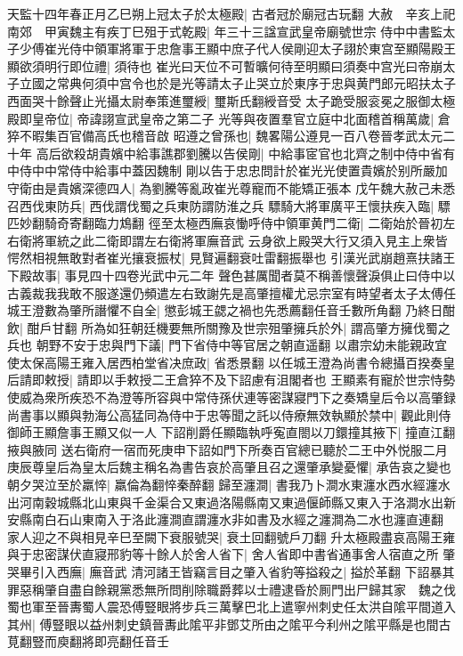 天監十四年春正月乙巳朔上冠太子於太極殿|{
	古者冠於廟冠古玩翻}
大赦　辛亥上祀南郊　甲寅魏主有疾丁巳殂于式乾殿|{
	年三十三諡宣武皇帝廟號世宗}
侍中中書監太子少傅崔光侍中領軍將軍于忠詹事王顯中庶子代人侯剛迎太子詡於東宫至顯陽殿王顯欲須明行即位禮|{
	須待也}
崔光曰天位不可暫曠何待至明顯曰須奏中宫光曰帝崩太子立國之常典何須中宫令也於是光等請太子止哭立於東序于忠與黄門郎元昭扶太子西面哭十餘聲止光攝太尉奉策進璽綬|{
	璽斯氏翻綬音受}
太子跪受服衮冕之服御太極殿即皇帝位|{
	帝諱詡宣武皇帝之第二子}
光等與夜置羣官立庭中北面稽首稱萬歲|{
	倉猝不暇集百官備高氏也稽音啟}
昭遵之曾孫也|{
	魏畧陽公遵見一百八卷晉孝武太元二十年}
高后欲殺胡貴嬪中給事譙郡劉騰以告侯剛|{
	中給事宧官也北齊之制中侍中省有中侍中中常侍中給事中蓋因魏制}
剛以告于忠忠問計於崔光光使置貴嬪於别所嚴加守衛由是貴嬪深德四人|{
	為劉騰等亂政崔光尊寵而不能矯正張本}
戊午魏大赦己未悉召西伐東防兵|{
	西伐謂伐蜀之兵東防謂防淮之兵}
驃騎大將軍廣平王懷扶疾入臨|{
	驃匹妙翻騎奇寄翻臨力鴆翻}
徑至太極西廡哀慟呼侍中領軍黄門二衛|{
	二衛始於晉初左右衛將軍統之此二衛即謂左右衛將軍廡音武}
云身欲上殿哭大行又須入見主上衆皆愕然相視無敢對者崔光攘衰振杖|{
	見賢遍翻衰吐雷翻振舉也}
引漢光武崩趙熹扶諸王下殿故事|{
	事見四十四卷光武中元二年}
聲色甚厲聞者莫不稱善懷聲淚俱止曰侍中以古義裁我我敢不服遂還仍頻遣左右致謝先是高肇擅權尤忌宗室有時望者太子太傅任城王澄數為肇所譖懼不自全|{
	懲彭城王勰之禍也先悉薦翻任音壬數所角翻}
乃終日酣飲|{
	酣戶甘翻}
所為如狂朝廷機要無所關豫及世宗殂肇擁兵於外|{
	謂高肇方擁伐蜀之兵也}
朝野不安于忠與門下議|{
	門下省侍中等官居之朝直遥翻}
以肅宗幼未能親政宜使太保高陽王雍入居西柏堂省决庶政|{
	省悉景翻}
以任城王澄為尚書令總攝百揆奏皇后請即敕授|{
	請即以手敕授二王倉猝不及下詔慮有沮閣者也}
王顯素有寵於世宗恃勢使威為衆所疾恐不為澄等所容與中常侍孫伏連等密謀寢門下之奏矯皇后令以高肇録尚書事以顯與勃海公高猛同為侍中于忠等聞之託以侍療無效執顯於禁中|{
	觀此則侍御師王顯詹事王顯又似一人}
下詔削爵任顯臨執呼寃直閤以刀鐶撞其掖下|{
	撞直江翻掖與腋同}
送右衛府一宿而死庚申下詔如門下所奏百官總已聽於二王中外悦服二月庚辰尊皇后為皇太后魏主稱名為書告哀於高肇且召之還肇承變憂懼|{
	承告哀之變也}
朝夕哭泣至於羸悴|{
	羸倫為翻悴秦醉翻}
歸至瀍澗|{
	書我乃卜澗水東瀍水西水經瀍水出河南穀城縣北山東與千金渠合又東過洛陽縣南又東過偃師縣又東入于洛澗水出新安縣南白石山東南入于洛此瀍澗直謂瀍水非如書及水經之瀍澗為二水也瀍直連翻}
家人迎之不與相見辛巳至闕下衰服號哭|{
	衰土回翻號戶刀翻}
升太極殿盡哀高陽王雍與于忠密謀伏直寢邢豹等十餘人於舍人省下|{
	舍人省即中書省通事舍人宿直之所}
肇哭畢引入西廡|{
	廡音武}
清河諸王皆竊言目之肇入省豹等搤殺之|{
	搤於革翻}
下詔暴其罪惡稱肇自盡自餘親黨悉無所問削除職爵葬以士禮逮昏於厠門出尸歸其家　魏之伐蜀也軍至晉夀蜀人震恐傅豎眼將步兵三萬擊巴北上遣寧州刺史任太洪自隂平間道入其州|{
	傅豎眼以益州刺史鎮晉夀此隂平非鄧艾所由之隂平今利州之隂平縣是也間古莧翻豎而庾翻將即亮翻任音壬}
